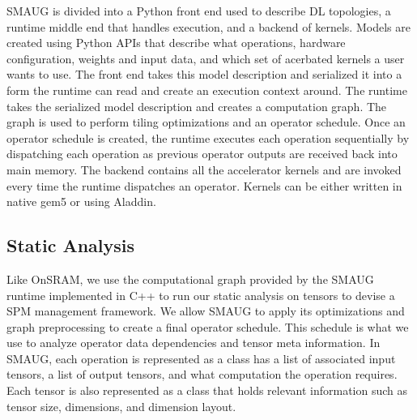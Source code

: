 SMAUG is divided into a Python front end used to describe DL topologies, a
runtime middle end that handles execution, and a backend of kernels. Models are
created using Python APIs that describe what operations, hardware
configuration, weights and input data, and which set of acerbated kernels a
user wants to use. The front end takes this model description and serialized it
into a form the runtime can read and create an execution context around. The
runtime takes the serialized model description and creates a computation graph.
The graph is used to perform tiling optimizations and an operator schedule.
Once an operator schedule is created, the runtime executes each operation
sequentially by dispatching each operation as previous operator outputs are
received back into main memory. The backend contains all the accelerator
kernels and are invoked every time the runtime dispatches an operator. Kernels
can be either written in native gem5 or using Aladdin.



\subsection{Static Analysis}

Like OnSRAM, we use the computational graph provided by the SMAUG runtime
implemented in C++ to run our static analysis on tensors to devise a SPM
management framework. We allow SMAUG to apply its optimizations and graph
preprocessing to create a final operator schedule. This schedule is what we use
to analyze operator data dependencies and tensor meta information. In SMAUG,
each operation is represented as a class has a list of associated input
tensors, a list of output tensors, and what computation the operation requires.
Each tensor is also represented as a class that holds relevant information such
as tensor size, dimensions, and dimension layout.




